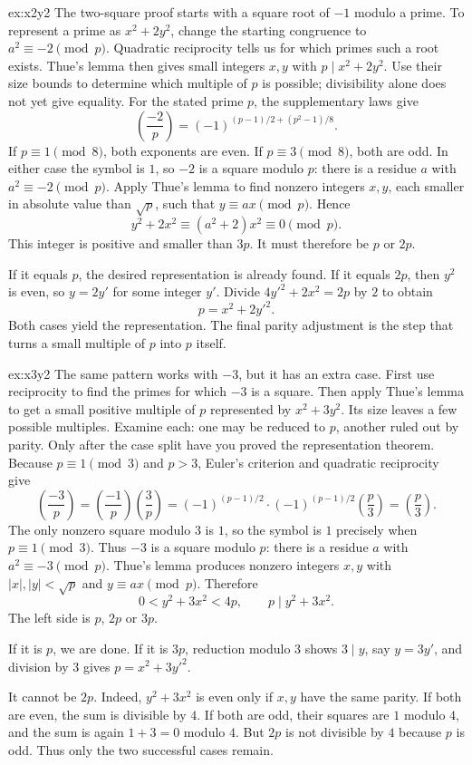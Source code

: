 \begin{solution}{ex:x2y2}
\idea The two-square proof starts with a square root of $-1$ modulo a prime. To represent a prime as $x^2+2y^2$, change the starting congruence to $a^2\equiv-2\pmod p$. Quadratic reciprocity tells us for which primes such a root exists. Thue's lemma then gives small integers $x,y$ with $p\mid x^2+2y^2$. Use their size bounds to determine which multiple of $p$ is possible; divisibility alone does not yet give equality.
\writeup For the stated prime $p$, the supplementary laws give
\[
\left(\frac{-2}p\right)=(-1)^{(p-1)/2+(p^2-1)/8}.
\]
If $p\equiv1\pmod8$, both exponents are even. If $p\equiv3\pmod8$, both are odd. In either case the symbol is $1$, so $-2$ is a square modulo $p$: there is a residue $a$ with $a^2\equiv-2\pmod p$. Apply Thue's lemma to find nonzero integers $x,y$, each smaller in absolute value than $\sqrt p$, such that $y\equiv ax\pmod p$. Hence
\[
y^2+2x^2\equiv(a^2+2)x^2\equiv0\pmod p.
\]
This integer is positive and smaller than $3p$. It must therefore be $p$ or $2p$.

If it equals $p$, the desired representation is already found. If it equals $2p$, then $y^2$ is even, so $y=2y'$ for some integer $y'$. Divide
$4y'^2+2x^2=2p$ by $2$ to obtain
\[
p=x^2+2y'^2.
\]
Both cases yield the representation. The final parity adjustment is the step that turns a small multiple of $p$ into $p$ itself.
\end{solution}

\begin{solution}{ex:x3y2}
\idea The same pattern works with $-3$, but it has an extra case. First use reciprocity to find the primes for which $-3$ is a square. Then apply Thue's lemma to get a small positive multiple of $p$ represented by $x^2+3y^2$. Its size leaves a few possible multiples. Examine each: one may be reduced to $p$, another ruled out by parity. Only after the case split have you proved the representation theorem.
\writeup Because $p\equiv1\pmod3$ and $p>3$, Euler's criterion and quadratic reciprocity give
\[
\left(\frac{-3}p\right)
=\left(\frac{-1}p\right)\left(\frac3p\right)
=(-1)^{(p-1)/2}\cdot(-1)^{(p-1)/2}\left(\frac p3\right)
=\left(\frac p3\right).
\]
The only nonzero square modulo $3$ is $1$, so the symbol is $1$ precisely when $p\equiv1\pmod3$. Thus $-3$ is a square modulo $p$: there is a residue $a$ with $a^2\equiv-3\pmod p$. Thue's lemma produces nonzero integers $x,y$ with $|x|,|y|<\sqrt p$ and $y\equiv ax\pmod p$. Therefore
\[
0<y^2+3x^2<4p,\qquad
p\mid y^2+3x^2.
\]
The left side is $p$, $2p$ or $3p$.

If it is $p$, we are done. If it is $3p$, reduction modulo $3$ shows $3\mid y$, say $y=3y'$, and division by $3$ gives $p=x^2+3y'^2$.

It cannot be $2p$. Indeed, $y^2+3x^2$ is even only if $x,y$ have the same parity. If both are even, the sum is divisible by $4$. If both are odd, their squares are $1$ modulo $4$, and the sum is again $1+3=0$ modulo $4$. But $2p$ is not divisible by $4$ because $p$ is odd. Thus only the two successful cases remain.
\end{solution}

